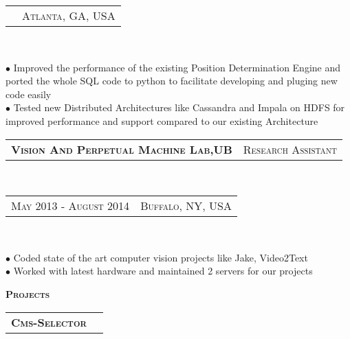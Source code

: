 \documentclass[10pt,a4paper,oneside]{article}
\begin{document}
\begin{minipage}[t]{0.63\textwidth}
{\begin{tabular}{c|c}
               &{\small A\textsc{tlanta}, GA, USA}
            \end{tabular}
        }\\ 
        \vspace{-4mm}
        \begin{adjustwidth}{7pt}{0pt}
            {\footnotesize $\bullet$ Improved the performance of the existing Position Determination Engine and ported the whole SQL code to python to facilitate developing and pluging new code easily\\
            $\bullet$ Tested new Distributed Architectures like Cassandra and Impala on HDFS for improved performance and support compared to our existing Architecture}\\
        \end{adjustwidth}
        \begin{tabular}{c|c}
            \textbf{\normalsize V\textsc{ision} A\textsc{nd} P\textsc{erpetual} M\textsc{achine} L\textsc{ab},UB}
            &\textmd{\normalsize R\textsc{esearch} A\textsc{ssistant}}
        \end{tabular}\\
        \textcolor{light-gray}{
            \begin{tabular}{c|c}
                {\small M\textsc{ay 2013} - A\textsc{ugust 2014}}
               &{\small B\textsc{uffalo}, NY, USA}
            \end{tabular}
        }\\ 
        \vspace{-4mm}
        \begin{adjustwidth}{7pt}{0pt}
            {\footnotesize $\bullet$ Coded state of the art computer vision projects like Jake, Video2Text\\
            $\bullet$ Worked with latest hardware and maintained 2 servers for our projects}\\
        \end{adjustwidth}
        \textcolor{light-gray}{\textbf{\large P\textsc{rojects}}}
        \vspace{10pt}\\
        \begin{tabular}{c|c}
            \textbf{\normalsize C\textsc{ms}-S\textsc{elector}}

\end{tabular}
\end{minipage}
\end{document}
